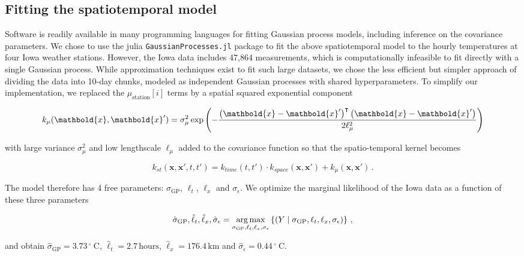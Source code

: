 \documentclass[letter]{article}
\newcommand{\genericdel}[3]{%
      \left#1#3\right#2
    }
\newcommand{\del}[1]{\genericdel(){#1}}
\newcommand{\sbr}[1]{\genericdel[]{#1}}
\newcommand{\cbr}[1]{\genericdel\{\}{#1}}
\DeclareMathOperator*{\argmax}{arg\,max}
\let\Pr\relax
\DeclareMathOperator{\Pr}{\mathbb{P}}
\newcommand{\station}[1]{\mathrm{station}\sbr{#1}}
\newcommand{\xvec}{\mathbold{x}}
\newcommand{\trans}{^{\intercal}}
\newcommand{\sigmaf}{\sigma_{\mathrm{GP}}}
\newcommand{\sigman}{\sigma_{\epsilon}}
\newcommand{\degreeC}{{}^{\circ}~\mathrm{C}}
\begin{document}
        \subsection{Fitting the spatiotemporal model}\label{fitting-the-spatiotemporal-model}

Software is readily available in many programming languages for fitting Gaussian process models, including inference on the covariance parameters. We chose to use the julia \texttt{GaussianProcesses.jl} package to fit the above spatiotemporal model to the hourly temperatures at four Iowa weather stations. However, the Iowa data includes 47,864 measurements, which is computationally infeasible to fit directly with a single Gaussian process. While approximation techniques exist to fit such large datasets, we chose the less efficient but simpler approach of dividing the data into 10-day chunks, modeled as independent Gaussian processes with shared hyperparameters. To simplify our implementation, we replaced the \(\mu_\station{i}\) terms by a spatial squared exponential component

\begin{equation}
    k_{\mu}(\xvec, \xvec') = \sigma_\mu^2 \exp\del{-\frac{\del{\xvec-\xvec'}\trans\del{\xvec-\xvec'}}{2\ell_\mu^2}}
\end{equation}

with large variance \(\sigma_\mu^2\) and low lengthscale \(\ell_\mu\) added to the covariance function so that the spatio-temporal kernel becomes

\begin{equation}
    k_{st}(\xvec,\xvec',t,t') = k_{time}(t,t') \cdot k_{space}(\xvec, \xvec') + k_\mu(\xvec, \xvec') \,.
\end{equation}

The model therefore has 4 free parameters: \(\sigmaf\), \(\ell_t\), \(\ell_x\) and \(\sigman\). We optimize the marginal likelihood of the Iowa data as a function of these three parameters

\begin{equation}
\label{eq:optimization}
\hat\sigmaf,\hat\ell_t,\hat\ell_x,\hat\sigman = \argmax_{\sigmaf,\ell_t,\ell_x,\sigman} \cbr{ \Pr\del{ Y \mid {\sigmaf,\ell_t,\ell_x,\sigman} } }\,,
\end{equation}

and obtain \(\hat\sigmaf=3.73\,\degreeC\), \(\hat\ell_t=2.7\,\mathrm{hours}\), \(\hat\ell_x=176.4\,\mathrm{km}\) and \(\hat\sigman=0.44\,\degreeC\).
    
\end{document}
